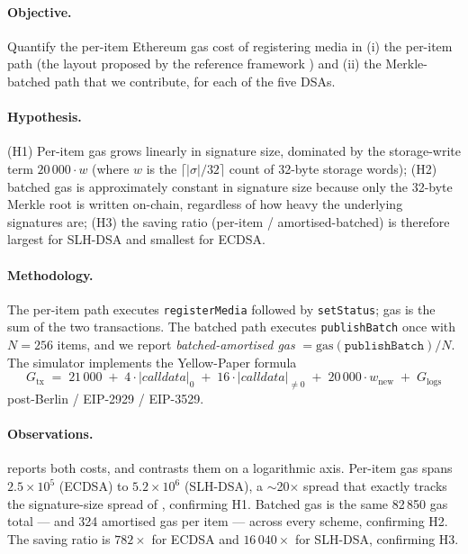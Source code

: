 \documentclass[11pt,a4paper]{article}
\theoremstyle{definition}
\theoremstyle{plain}
\theoremstyle{remark}
\begin{document}
\paragraph{Objective.}
Quantify the per-item Ethereum gas cost of registering media in (i)
the per-item path (the layout proposed by the reference framework
\cite{bib4}) and (ii) the Merkle-batched path that we contribute, for
each of the five DSAs.

\paragraph{Hypothesis.}
(H1) Per-item gas grows linearly in signature size, dominated by the
storage-write term $20\,000\!\cdot\!w$ (where $w$ is the
$\lceil |\sigma|/32 \rceil$ count of 32-byte storage words);
(H2) batched gas is approximately constant in signature size because
only the 32-byte Merkle root is written on-chain, regardless of how
heavy the underlying signatures are;
(H3) the saving ratio (per-item / amortised-batched) is therefore
largest for SLH-DSA and smallest for ECDSA.

\paragraph{Methodology.}
The per-item path executes \texttt{registerMedia} followed by
\texttt{setStatus}; gas is the sum of the two transactions. The
batched path executes \texttt{publishBatch} once with $N\!=\!256$
items, and we report
\emph{batched-amortised gas} $= \mathrm{gas}(\texttt{publishBatch}) / N$.
The simulator implements the Yellow-Paper formula
\[
G_{\mathrm{tx}}\;=\;
21\,000
\;+\;
4\!\cdot\!|\mathit{calldata}|_0
\;+\;
16\!\cdot\!|\mathit{calldata}|_{\neq 0}
\;+\;
20\,000\!\cdot\!w_{\mathrm{new}}
\;+\;
G_{\mathrm{logs}}
\]
post-Berlin / EIP-2929 / EIP-3529.

\paragraph{Observations.}
 reports both costs, and  contrasts
them on a logarithmic axis. Per-item gas spans
$2.5\!\times\!10^5$ (ECDSA) to $5.2\!\times\!10^6$ (SLH-DSA), a
$\sim$20$\times$ spread that exactly tracks the signature-size spread
of , confirming H1. Batched gas is the same 82\,850
gas total --- and 324 amortised gas per item --- across every scheme,
confirming H2. The saving ratio is
$782\!\times$ for ECDSA and $16\,040\!\times$ for SLH-DSA, confirming
H3.
\end{document}

